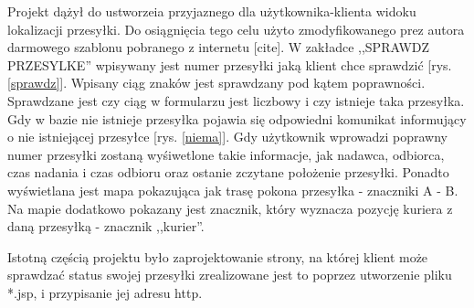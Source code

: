 \documentclass[eng,printmode,oneside]{mgr}
\begin{document}
Projekt dążył do ustworzeia przyjaznego dla użytkownika-klienta widoku
lokalizacji przesyłki. Do osiągnięcia tego celu użyto zmodyfikowanego prez
autora darmowego szablonu pobranego z internetu [cite{}]. W zakładce ,,SPRAWDZ
PRZESYLKE'' wpisywany jest numer przesyłki jaką klient chce sprawdzić [rys.
\ref{sprawdz}]. Wpisany ciąg znaków jest sprawdzany pod kątem poprawności.
Sprawdzane jest czy ciąg w formularzu jest liczbowy i czy istnieje taka
przesyłka. Gdy w bazie nie istnieje przesyłka pojawia się odpowiedni komunikat
informujący o nie istniejącej przesyłce [rys. \ref{niema}]. Gdy użytkownik
wprowadzi poprawny numer przesyłki zostaną wyśiwetlone takie informacje, jak
nadawca, odbiorca, czas nadania i czas odbioru oraz ostanie zczytane położenie
przesyłki. Ponadto wyświetlana jest mapa pokazująca jak trasę pokona przesyłka -
znaczniki A - B. Na mapie dodatkowo pokazany jest znacznik, który wyznacza
pozycję kuriera z daną przesyłką - znacznik ,,kurier''.

Istotną częścią projektu było zaprojektowanie strony, na której
klient może sprawdzać status swojej przesyłki zrealizowane jest to poprzez utworzenie pliku
*.jsp, i przypisanie jej adresu http.
\end{document}
